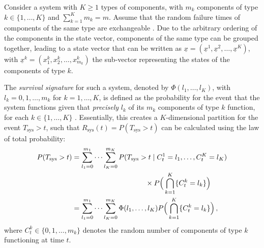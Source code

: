 \documentclass[12pt, a4paper]{elsarticle}
\newcommand{\Rsys}{R_\text{sys}}
\def\Tsys{T_\text{sys}}
\begin{document}
Consider a system with $K\ge 1$ types of components, with $m_k$ components of type $k \in \{1,\ldots,K\}$ and 
$\sum_{k=1}^K m_k = m$. Assume that the random failure times of components of the same type are exchangeable \citep{DF74}.
Due to the arbitrary ordering of the components in the state vector, components of the same type can be grouped together, 
leading to a state vector that can be written as 
$\underline{x} = (\underline{x}^1,\underline{x}^2,\ldots,\underline{x}^K)$, with 
$\underline{x}^k = (x^k_1,x^k_2,\ldots,x^k_{m_k})$ the sub-vector representing the states of the components of type $k$. 

The \emph{survival signature} for such a system, denoted by $\Phi(l_1,\ldots,l_K)$, with $l_k=0,1,\ldots,m_k$ 
for $k=1,\ldots,K$, is defined as the probability for the event that the system functions given that \emph{precisely} $l_k$ of its 
$m_k$ components of type $k$ function, for each $k\in \{1,\ldots,K\}$ \citep{2012:survsign}.
Essentially, this creates a $K$-dimensional partition for the event $\Tsys > t$, such that $\Rsys(t) = P(\Tsys > t)$
can be calculated using the law of total probability:
\begin{align}
\label{eq:rsyswithsurvsign}
P(\Tsys > t)
 &= \sum_{l_1=0}^{m_1} \cdots \sum_{l_K=0}^{m_K} P(\Tsys > t \mid C^1_t = l_1,\ldots, C^K_t = l_K) \nonumber\\
 &  \hspace*{24ex}                        \times P\Big( \bigcap_{k=1}^K \{ C^k_t = l_k\} \Big) \nonumber\\
 &= \sum_{l_1=0}^{m_1} \cdots \sum_{l_K=0}^{m_K} \Phi(l_1, \ldots, l_K)
                                                 P\Big( \bigcap_{k=1}^K \{ C^k_t = l_k\} \Big) \,,
\end{align}
where $C^k_t \in \{0, 1, \ldots, m_k\}$ denotes
the random number of components of type $k$ functioning at time $t$. 
\end{document}
